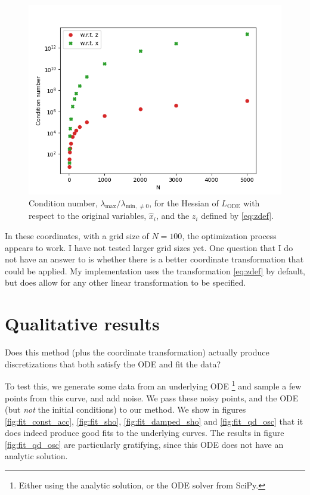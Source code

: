 \documentclass{article}
\begin{document}
\begin{figure}
\includegraphics{images/method/condition_numbers.png}
\centering
\caption{
Condition number, $\lambda_{\mathrm{max}} / \lambda_{\mathrm{min}, \ne 0}$, for the Hessian of $L_{\mathrm{ODE}}$ with respect to the original variables, $\hat{x}_i$, and the $z_i$ defined by \eqref{eq:zdef}.
}
\label{fig:condition_numbers}
\end{figure}

In these coordinates, with a grid size of $N=100$, the optimization process appears to work.
I have not tested larger grid sizes yet.
One question that I do not have an answer to is whether there is a better coordinate transformation that could be applied.
My implementation uses the transformation \eqref{eq:zdef} by default, but does allow for any other linear transformation to be specified.

\section{Qualitative results}
\label{sec:qual_results}

Does this method (plus the coordinate transformation) actually produce discretizations that both satisfy the ODE and fit the data?

To test this, we generate some data from an underlying ODE%
\footnote{
Either using the analytic solution, or the ODE solver from SciPy.
}
and sample a few points from this curve, and add noise.
We pass these noisy points, and the ODE (but \emph{not} the initial conditions) to our method.
We show in figures \ref{fig:fit_const_acc}, \ref{fig:fit_sho}, \ref{fig:fit_damped_sho} and \ref{fig:fit_qd_osc} that it does indeed produce good fits to the underlying curves.
The results in figure \ref{fig:fit_qd_osc} are particularly gratifying, since this ODE does not have an analytic solution.
\end{document}
